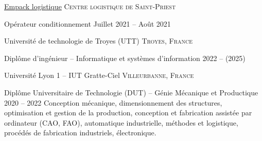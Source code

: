 \documentclass[10pt,a4paper]{article} %
\begin{document}

\headedsection %
{\href{https://empack.fr/}{Empack logistique}}
{\textsc{Centre logistique de Saint-Priest}} {

    \headedsubsection %
    {Opérateur conditionnement}
    {Juillet 2021 -- Août 2021}
    {}
}


\spacedhrule{-0.2em}{-0.4em} %



\headedsection %
{Université de technologie de Troyes (UTT)}
{\textsc{Troyes, France}} {

    \headedsubsection %
    {Diplôme d'ingénieur -- Informatique et systèmes d'information}
    {2022 -- (2025)}
    {}
}


\headedsection %
{Université Lyon 1 -- IUT Gratte-Ciel}
{\textsc{Villeurbanne, France}} {

    \headedsubsection %
    {Diplôme Universitaire de Technologie (DUT) -- Génie Mécanique et Productique}
    {2020 -- 2022}{\bodytext
        {Conception mécanique, dimensionnement des structures, optimisation et gestion de la production,
            conception et fabrication assistée par ordinateur (CAO, FAO), automatique industrielle,
            méthodes et logistique, procédés de fabrication industriels, électronique.}}
}
\end{document}
